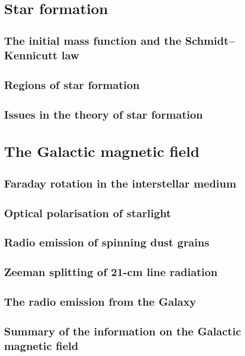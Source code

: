 \documentclass[12pt,a4paper]{article}
\begin{document}
\section{Star formation}



\subsection{The initial mass function and the Schmidt–Kennicutt law}


\subsection{Regions of star formation}



\subsection{Issues in the theory of star formation}


\section{The Galactic magnetic field}




\subsection{Faraday rotation in the interstellar medium}



\subsection{Optical polarisation of starlight}



\subsection{Radio emission of spinning dust grains}



\subsection{Zeeman splitting of 21-cm line radiation}


\subsection{The radio emission from the Galaxy}

\subsection{Summary of the information on the Galactic magnetic field}



\end{document}
